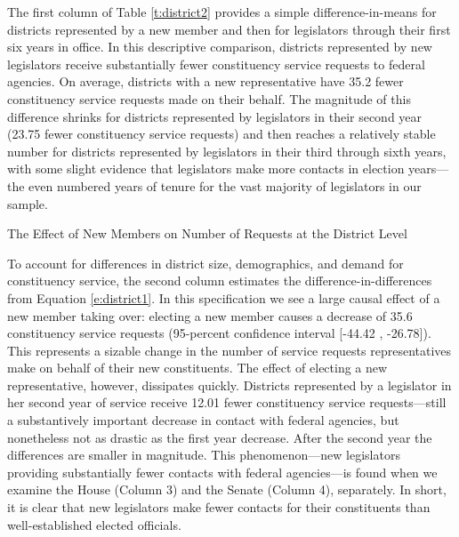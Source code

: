 \documentclass[12pt]{article}
\begin{document}
The first column of Table \ref{t:district2} provides a simple difference-in-means for districts represented by a new member and then for legislators through their first six years in office.  In this descriptive comparison, districts represented by new legislators receive substantially fewer constituency service requests to federal agencies.  On average, districts with a new representative have 35.2 fewer constituency service requests made on their behalf.  The magnitude of this difference shrinks for districts represented by legislators in their second year (23.75 fewer constituency service requests) and then reaches a relatively stable number for districts represented by legislators in their third through sixth years, with some slight evidence that legislators make more contacts in election years---the even numbered years of tenure for the vast majority of legislators in our sample. 



\begin{table}[hbt!]
\caption{The Effect of New Members on Number of Requests at the District Level} \label{t:district2}
\begin{minipage}{\textwidth}
\begin{center}

\end{center}
\end{minipage}
\end{table}


To account for differences in district size, demographics, and demand for constituency service, the second column estimates the difference-in-differences from Equation \ref{e:district1}.  In this specification we see a large causal effect of a new member taking over: electing a new member causes a decrease of 35.6 constituency service requests (95-percent confidence interval [-44.42 , -26.78]).  This represents a sizable change in the number of service requests representatives make on behalf of their new constituents.  The effect of electing a new representative, however, dissipates quickly. Districts represented by a legislator in her second year of service receive 12.01 fewer constituency service requests---still a substantively important decrease in contact with federal agencies, but nonetheless not as drastic as the first year decrease.  After the second year the differences are smaller in magnitude.  This phenomenon---new legislators providing substantially fewer contacts with federal agencies---is found when we examine the House (Column 3) and the Senate (Column 4), separately.  In short, it is clear that new legislators make fewer contacts for their constituents than well-established elected officials.   
\end{document}
